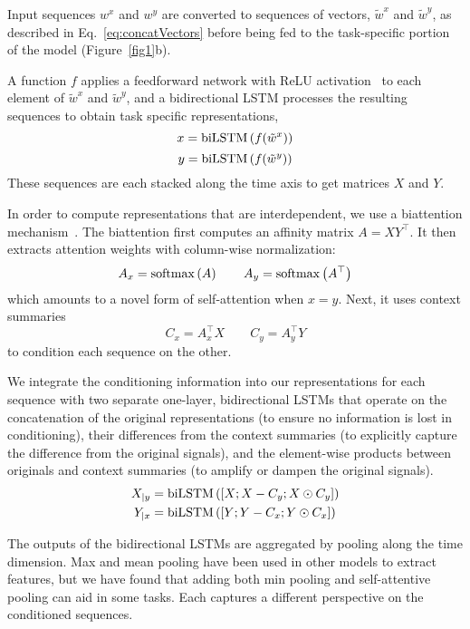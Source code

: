 \documentclass{article}
\newcommand{\bilstm}[1]{{\rm biLSTM} \left( #1 \right)}
\newcommand{\softmax}[1]{{\rm softmax} \left( #1 \right)}
\begin{document}
Input sequences $w^x$ and $w^y$ are converted to sequences of vectors, $\tilde w^x$ and $\tilde w^y$, as described in  Eq.~\ref{eq:concatVectors} before being fed to the task-specific portion of the model (Figure~\ref{fig1}b).

A function $f$ applies a feedforward network with ReLU activation~\citep{Nair10} 
to each element of  $\tilde w^x$ and $\tilde w^y$, 
and a bidirectional LSTM processes
the resulting sequences to obtain task specific representations, 
\begin{equation}
x = \bilstm{f(\tilde w^x)}
\label{eq:taskVectorsX}
\end{equation}
\begin{equation}
y = \bilstm{f(\tilde w^y)}
\label{eq:taskVectorsY}
\end{equation}
These sequences are each stacked along the time axis to get matrices $X$ and $Y$.

In order to compute representations that are interdependent, 
we use a biattention mechanism~\citep{Seo2017BidirectionalAF,Xiong2017}.
The biattention first computes an affinity matrix $A=XY^\top$. 
It then extracts attention weights with column-wise normalization:
\begin{equation}
A_x=\softmax{A}
\qquad
A_y=\softmax{A^\top}
\end{equation}
which amounts to a novel form of self-attention when $x=y$. 
Next, 
it uses context summaries 
\begin{equation}
C_x=A^\top_x X
\qquad 
C_y=A_y^\top Y
\end{equation}
to condition each sequence on the other.\bigskip

We integrate the conditioning information into our representations
for each sequence with two separate one-layer, 
bidirectional LSTMs that operate on the concatenation of
the original representations
(to ensure no information is lost in conditioning), 
their differences from the context summaries
(to explicitly capture the difference from the original signals),
and the element-wise products between originals and context summaries
(to amplify or dampen the original signals).
\begin{align}
X_{|y} &= \bilstm{ \left[X; X - C_y; X \odot C_y \right]}
\\
Y_{|x} &= \bilstm{ \left[Y; Y - C_x; Y \odot C_x \right] }
\end{align}

The outputs of the bidirectional LSTMs are aggregated by pooling along the time dimension.
Max and mean pooling have been used in other models to extract features, 
but we have found that adding both min pooling 
and self-attentive pooling can aid in some tasks.
Each captures a different perspective on the conditioned sequences.
\end{document}
